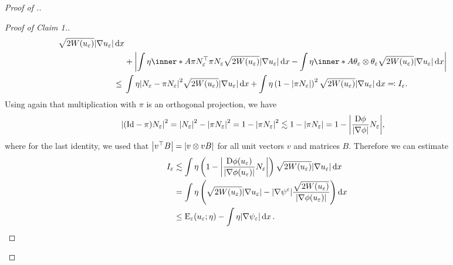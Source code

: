 \begin{proof}[Proof of .]
\begin{proof}[Proof of Claim 1.]
\begin{align*}
{				\sqrt{ 2 W ( u_{ \varepsilon } ) }
				\abs{ \nabla u_{ \varepsilon } }
				\dd{ x }
			}
			\\
			& + 
			\abs{ 
				\int
				\eta
				\inner*{ A }
				{ \pi N_{ \varepsilon }^{ \top } \pi N_{ \varepsilon } }
				\sqrt{ 2 W ( u_{ \varepsilon } ) } \abs{ \nabla u_{ 
						\varepsilon } }
				\dd{ x }
				-
				\int
				\eta
				\inner*{ A }
				{ \theta_{ \varepsilon } \otimes \theta_{ \varepsilon } }
				\sqrt{ 2 W ( u_{ \varepsilon } ) }
				\abs{ \nabla u_{ \varepsilon } }
				\dd{ x }
			}
			\\
			\leq{} & 
			\int
			\eta
			\abs{ N_{ \varepsilon } - \pi N_{ \varepsilon } }^{ 2 }
			\sqrt{ 2 W ( u_{ \varepsilon} ) } \abs{ \nabla u_{ \varepsilon 
			} }
			\dd{ x }
			+
			\int
			\eta
			\left( 
			1 - \abs{ \pi N_{ \varepsilon } }
			\right)^{ 2 }
			\sqrt{ 2 W ( u_{ \varepsilon } ) } \abs{ \nabla u_{ \varepsilon 
			} }
			\dd{ x }
			\eqqcolon I_{ \varepsilon }.
		\end{align*}
		Using again that multiplication with $ \pi $ is an orthogonal 
		projection, we have
		\begin{align*}
			\abs{
				( \mathrm{Id} - \pi ) N_{ \varepsilon }
			}^{ 2 }
			& =
			\abs{ N_{ \varepsilon } }^{ 2 } 
			-
			\abs{ \pi N_{ \varepsilon } }^{ 2 }
			=
			1 - \abs{ \pi N_{ \varepsilon } }^{ 2 }
			\lesssim
			1 - \abs{ \pi N_{ \varepsilon } }
			=
			1 -
			\abs{ \frac{ \mathrm{D} \phi }{ \abs{ \nabla \phi } } N_{ \varepsilon } 
			},
		\end{align*}
		where for the last identity, we used that $ \abs{ v^{ \top } B } = 
		\abs{ v \otimes v B } $ for all unit vectors $ v $ and matrices $ B $.
		Therefore we can estimate
		\begin{align*}
			I_{ \varepsilon }
			& \lesssim
			\int
			\eta
			\left(
			1 - \abs{ \frac{ \mathrm{D} \phi ( u_{ \varepsilon } ) }{ \abs{ \nabla 
			\phi ( u_{ \varepsilon } ) } } N_{ 
					\varepsilon } }
			\right)
			\sqrt{ 2 W ( u_{ \varepsilon } ) }
			\abs{ \nabla u_{ \varepsilon } }
			\dd{ x }
			\\
			& =
			\int
			\eta 
			\left(
			\sqrt{ 2 W ( u_{ \varepsilon } ) }
			\abs{ \nabla u_{ \varepsilon } }
			-
			\abs{ \nabla \psi^{ \varepsilon } }
			\frac{ \sqrt{ 2 W ( u_{ \varepsilon } ) } }{ \abs{ \nabla 
					\phi ( u_{ \varepsilon } ) } }
			\right)
			\dd{ x }
			\\
			& \leq
			\operatorname{E}_{ \varepsilon } ( u_{ \varepsilon } ; \eta )
			-
			\int
			\eta
			\abs{ \nabla \psi_{ \varepsilon } }
			\dd{ x }.
		\end{align*}

\end{proof}
\end{proof}
